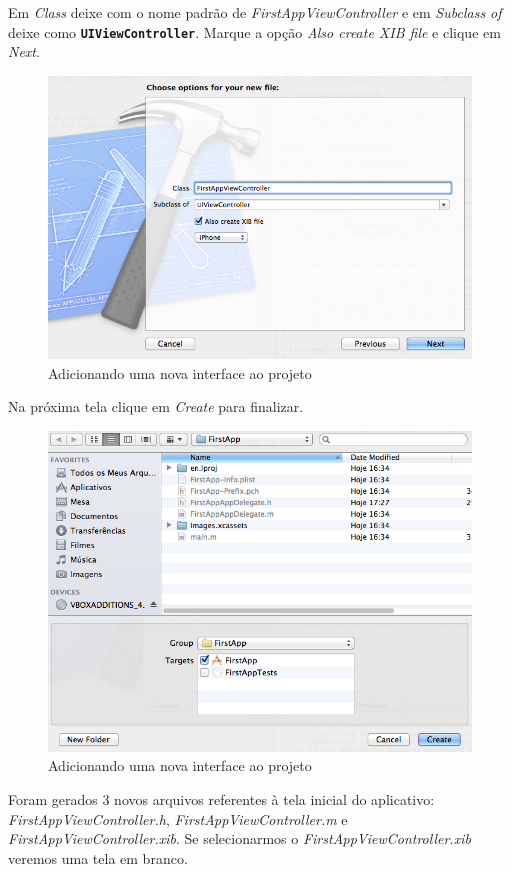 \documentclass[a4paper,12pt,brazil,doubleside]{book}
\begin{document}
\begin{singlespace}
Em \emph{Class} deixe com o nome padrão de \emph{FirstAppViewController} e em \emph{Subclass of} deixe como \texttt{\textbf{UIViewController}}. Marque a opção \emph{Also create XIB file} e clique em \emph{Next}.

\begin{figure}[H]
  \centering
  \includegraphics[width=.75\textwidth]{figuras/3/tela_novo_projeto_8.png}
  \caption{Adicionando uma nova interface ao projeto}
  \label{fig:a}
\end{figure}


Na próxima tela clique em \emph{Create} para finalizar.

\begin{figure}[H]
  \centering
  \includegraphics[width=.75\textwidth]{figuras/3/tela_novo_projeto_9.png}
  \caption{Adicionando uma nova interface ao projeto}
  \label{fig:a}
\end{figure}


Foram gerados 3 novos arquivos referentes à tela inicial do aplicativo: \emph{FirstAppViewController.h}, \emph{FirstAppViewController.m} e \emph{FirstAppViewController.xib}. Se selecionarmos o \emph{FirstAppViewController.xib} veremos uma tela em branco.


\end{singlespace}
\end{document}

